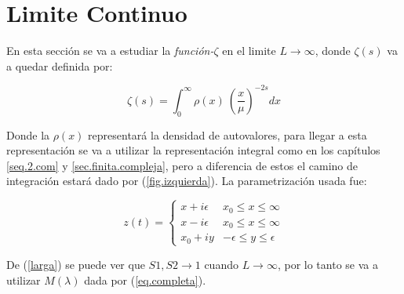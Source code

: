 \chapter{Limite Continuo}

En esta sección se va a estudiar la {\it función-$\zeta $} en el limite $L \rightarrow \infty$, donde $\zeta  (s)$ va a quedar definida por:

\begin{equation}
\zeta (s) = \int _{0} ^{\infty} \rho (x) \ \left( \frac{x}{\mu } \right) ^{-2 s} dx
\end{equation}

Donde la $\rho(x) $ representará la densidad de autovalores, para llegar a esta representación se va a utilizar la representación integral como en los capítulos \ref{seq.2.com} y \ref{sec.finita.compleja}, pero a diferencia de estos el camino de integración estará dado por  (\ref{fig.izquierda}). La parametrización usada fue:


\[
z(t) =  
	  \begin{cases} 
      x + i \epsilon  & x _0 \leq x \leq \infty \\
      x - i \epsilon  & x _0 \leq x \leq \infty \\
      x _0 + i y		  & - \epsilon \leq y \leq \epsilon
   \end{cases}
\]

De (\ref{larga}) se puede ver que $S1,S2 \rightarrow 1$ cuando $L \rightarrow \infty$, por lo tanto se va a utilizar $M ( \lambda)$ dada por (\ref{eq.completa}).\\


